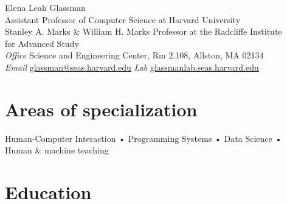 \documentclass[10pt, a4paper]{article}
\begin{document}
{\LARGE Elena Leah Glassman}\\[0.25cm]
{\large Assistant Professor of Computer Science at Harvard University\\ [0.1cm]
Stanley A. Marks \& William H. Marks Professor at the Radcliffe Institute\\for Advanced Study}\\[0.5cm]
\textit{Office} Science and Engineering Center, Rm 2.108, Allston, MA 02134\\%
\textit{Email} \href{mailto:glassman@seas.harvard.edu}{glassman@seas.harvard.edu} \textit{Lab} \href{http://glassmanlab.seas.harvard.edu/}{glassmanlab.seas.harvard.edu}

\section*{Areas of specialization}
Human-Computer Interaction • Programming Systems • Data Science • Human \& machine teaching  



\section*{Education}
\noindent
\end{document}
